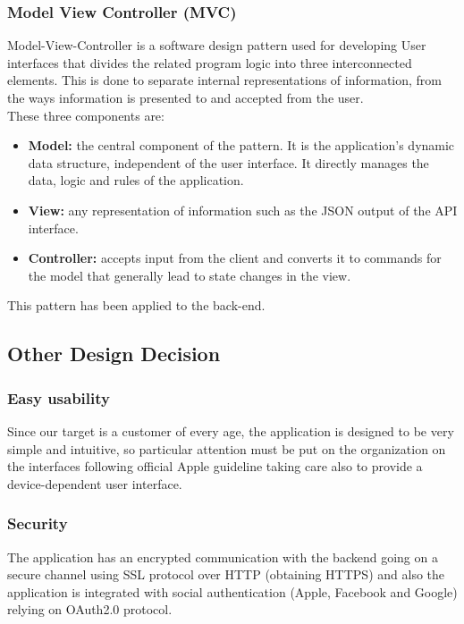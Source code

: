 \subsubsection{Model View Controller (MVC)}
Model-View-Controller is a software design pattern used for developing User interfaces that divides the related program logic into three interconnected elements. This is done to separate internal representations of information, from the ways information is presented to and accepted from the user.\\
These three components are:
\begin{itemize}
    \item \textbf{Model:} the central component of the pattern. It is the application's dynamic data structure, independent of the user interface. It directly manages the data, logic and rules of the application.
    \item  \textbf{View:} any representation of information such as the JSON output of the API interface. 
    \item  \textbf{Controller:} accepts input from the client and converts it to commands for the model that generally lead to state changes in the view.
\end{itemize} 
This pattern has been applied to the back-end.

\subsection{Other Design Decision}

\subsubsection{Easy usability}
Since our target is a customer of every age, the application is designed to be very simple and intuitive, so particular attention must be put on the organization on the interfaces following official Apple guideline taking care also to provide a device-dependent user interface.

\subsubsection{Security}
The application has an encrypted communication with the backend going on a secure channel using SSL protocol over HTTP (obtaining HTTPS) and also the application is integrated with social authentication (Apple, Facebook and Google) relying on OAuth2.0 protocol.

